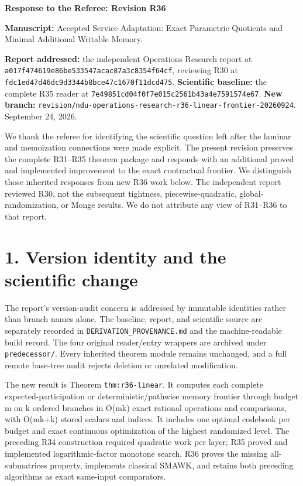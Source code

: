 \documentclass[11pt,letterpaper]{article}
\begin{document}
\begin{center}\Large\bfseries Response to the Referee: Revision R36\end{center}

\textbf{Manuscript:} Accepted Service Adaptation: Exact Parametric Quotients and Minimal Additional Writable Memory.


\textbf{Report addressed:} the independent Operations Research report at \nolinkurl{a017f474619e86be533547acac87a3c8354f64cf}, reviewing R30 at \nolinkurl{fdc1ed47d46dc9d3344b8bce47c1670f11dcd475}. \textbf{Scientific baseline:} the complete R35 reader at \nolinkurl{7e49851cd04f0f7e015c2561b43a4e7591574e67}. \textbf{New branch:} \nolinkurl{revision/ndu-operations-research-r36-linear-frontier-20260924}. September 24, 2026.


We thank the referee for identifying the scientific question left after the laminar and memoization connections were made explicit. The present revision preserves the complete R31--R35 theorem package and responds with an additional proved and implemented improvement to the exact contractual frontier. We distinguish those inherited responses from new R36 work below. The independent report reviewed R30, not the subsequent tightness, piecewise-quadratic, global-randomization, or Monge results. We do not attribute any view of R31--R36 to that report.


\section*{1. Version identity and the scientific change}

The report's version-audit concern is addressed by immutable identities rather than branch names alone. The baseline, report, and scientific source are separately recorded in \nolinkurl{DERIVATION_PROVENANCE.md} and the machine-readable build record. The four original reader/entry wrappers are archived under \nolinkurl{predecessor/}. Every inherited theorem module remains unchanged, and a full remote base-tree audit rejects deletion or unrelated modification.


The new result is Theorem \nolinkurl{thm:r36-linear}. It computes each complete expected-participation or deterministic/pathwise memory frontier through budget m on k ordered branches in O(mk) exact rational operations and comparisons, with O(mk+k) stored scalars and indices. It includes one optimal codebook per budget and exact continuous optimization of the highest randomized level. The preceding R34 construction required quadratic work per layer; R35 proved and implemented logarithmic-factor monotone search. R36 proves the missing all-submatrices property, implements classical SMAWK, and retains both preceding algorithms as exact same-input comparators.
\end{document}
